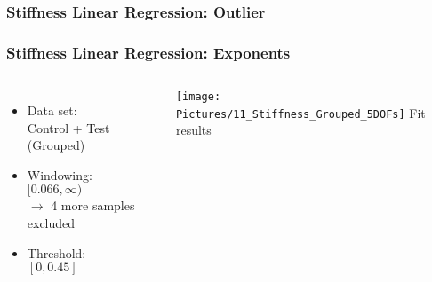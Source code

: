 \documentclass[xcolor=table]{beamer}
\begin{document}
\begin{frame}
	\frametitle{Stiffness Linear Regression: Outlier}
	\begin{figure}
		\captionsetup[subfigure]{labelformat=empty}
		\qquad
		\qquad
	\end{figure}
\end{frame}


\begin{frame}
	\frametitle{Stiffness Linear Regression: Exponents}
	\begin{columns}[c]
		\begin{itemize}[label=$\bullet$]
			\item Data set:\\
			Control + Test (Grouped)
			\item Windowing:\\
			$[0.066,\infty)$ \\ $\rightarrow$ 4 more samples excluded
			\item Threshold:\\
			$[0,0.45]$
		\end{itemize}
		\centering
		\vfill
		\texttt{[image: Pictures/11\_Stiffness\_Grouped\_5DOFs]}
		Fit results
		\vfill
	\end{columns}
\end{frame}

\end{document}
